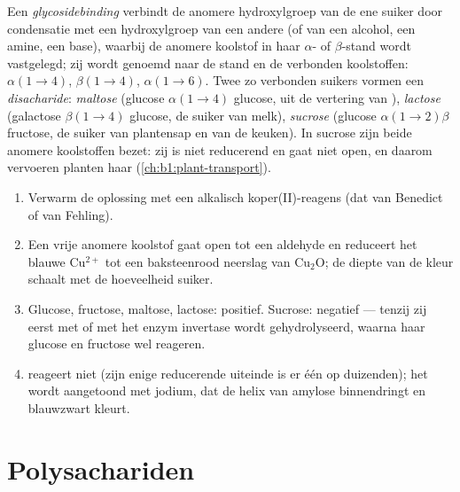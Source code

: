 \begin{definition}\label{def:b1:carbohydrates:glycosidic}
Een \emph{glycosidebinding} verbindt de anomere
hydroxylgroep van de ene suiker door condensatie met een hydroxylgroep van een
andere (of van een alcohol, een amine, een base), waarbij de anomere koolstof in
haar $\alpha$- of $\beta$-stand wordt vastgelegd; zij wordt genoemd naar de stand
en de verbonden koolstoffen: $\alpha(1{\to}4)$, $\beta(1{\to}4)$,
$\alpha(1{\to}6)$. Twee zo verbonden suikers vormen een
\emph{disacharide}: \emph{maltose}
(glucose $\alpha(1{\to}4)$ glucose, uit de vertering van ),
\emph{lactose} (galactose $\beta(1{\to}4)$ glucose, de suiker van melk),
\emph{sucrose} (glucose $\alpha(1{\to}2)\beta$ fructose, de suiker van plantensap
en van de keuken). In sucrose zijn beide anomere koolstoffen bezet: zij is niet
reducerend en gaat niet open, en daarom vervoeren planten haar
(\cref{ch:b1:plant-transport}).
\end{definition}

\begin{method}\label{met:b1:carbohydrates:reducing}
\begin{enumerate}
  \item Verwarm de oplossing met een alkalisch koper(II)-reagens (dat van
        Benedict of van Fehling).
  \item Een vrije anomere koolstof gaat open tot een aldehyde en reduceert
        het blauwe $\mathrm{Cu^{2+}}$ tot een baksteenrood neerslag van
        $\mathrm{Cu_2O}$; de diepte van de kleur schaalt met de hoeveelheid
        suiker.
  \item Glucose, fructose, maltose, lactose: positief. Sucrose: negatief
        --- tenzij zij eerst met  of met het enzym invertase wordt
        gehydrolyseerd, waarna haar glucose en fructose wel reageren.
  \item {} reageert niet (zijn enige reducerende uiteinde is er één op
        duizenden); het wordt aangetoond met jodium, dat de helix van
        amylose binnendringt en blauwzwart kleurt.
\end{enumerate}
\end{method}

\section{Polysachariden}

